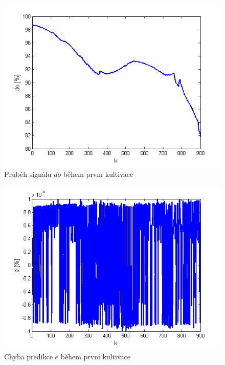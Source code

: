 \begin{figure}
    \centering
    \includegraphics[scale=0.8]{IMG/artep/artep17_1.png}
    \caption{Průběh signálu $do$ během první kultivace}
    \label{fig:artep_1}
\end{figure}

\begin{figure}
    \centering
    \includegraphics[scale=0.8]{IMG/artep/artep17_3.png}
    \caption{Chyba predikce $e$ během první kultivace}
    \label{fig:artep_3}
\end{figure}

